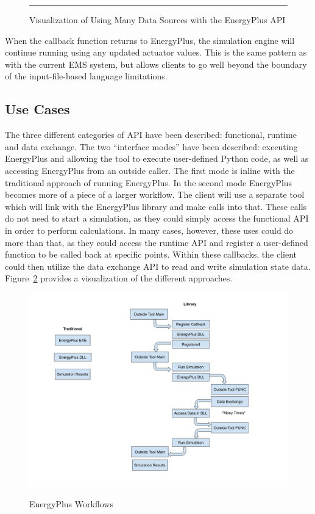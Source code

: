 \documentclass[5p, authoryear]{elsarticle}
\begin{document}
\begin{figure}
\begin{center}
\label{figure:api:purpose:callback_collection}
\rule{2cm}{2cm}
\caption{Visualization of Using Many Data Sources with the EnergyPlus API}
\end{center}
\end{figure}

When the callback function returns to EnergyPlus, the simulation engine will continue running using any updated actuator values.
This is the same pattern as with the current EMS system, but allows clients to go well beyond the boundary of the input-file-based language limitations.

  \subsection{Use Cases}
The three different categories of API have been described: functional, runtime and data exchange.  The two “interface modes” have been described: executing EnergyPlus and allowing the tool to execute user-defined Python code, as well as accessing EnergyPlus from an outside caller.  The first mode is inline with the traditional approach of running EnergyPlus.  In the second mode EnergyPlus becomes more of a piece of a larger workflow.  The client will use a separate tool which will link with the EnergyPlus library and make calls into that.  These calls do not need to start a simulation, as they could simply access the functional API in order to perform calculations.  In many cases, however, these uses could do more than that, as they could access the runtime API and register a user-defined function to be called back at specific points.  Within these callbacks, the client could then utilize the data exchange API to read and write simulation state data.  Figure~\ref{figure:api:uses:workflows} provides a visualization of the different approaches.

\begin{figure}
\begin{center}
\label{figure:api:uses:workflows}
\includegraphics[width=\columnwidth]{images/api_workflows.png}
\caption{EnergyPlus Workflows}
\end{center}
\end{figure}
\end{document}
